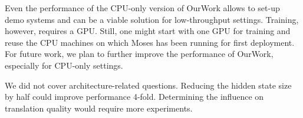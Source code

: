 \documentclass[11pt]{article}
\begin{document}
Even the performance of the CPU-only version of OurWork allows to set-up demo systems and can be a viable solution for low-throughput settings. Training, however, requires a GPU. Still, one might start with one GPU for training and reuse the CPU machines on which Moses has been running  for first deployment. For future work, we plan to further improve the performance of OurWork, especially for CPU-only settings.

We did not cover architecture-related questions. Reducing the hidden state size by half could improve performance 4-fold. Determining the influence on translation quality would require more experiments.





\end{document}

